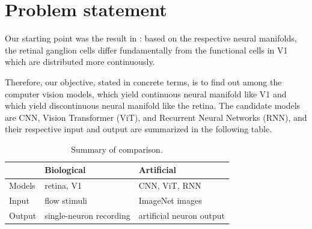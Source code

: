 \section{Problem statement}
\label{intro-objective}

Our starting point was the result in \cite{dyballa_manifold_2021}: based on the respective neural manifolds, the retinal ganglion cells differ fundamentally from the functional cells in V1 which are distributed more continuously. 


Therefore, our objective, stated in concrete terms, is to find out among the computer vision models, which yield continuous neural manifold like V1 and which yield discontinuous neural manifold like the retina. The candidate models are CNN, Vision Transformer (ViT), and Recurrent Neural Networks (RNN), and their respective input and output are summarized in the following table.

\begin{table}[H]
\centering
\begin{tabular}{|l|l|l|}
\hline
        & Biological & Artificial     \\ \hline
Models   & retina, V1      & CNN, ViT, RNN \\\hline
Input & flow stimuli \cite{visual-flow}  & ImageNet images \cite{deng2009imagenet} \\ \hline
Output & single-neuron recording & artificial neuron output \\ \hline
\end{tabular}
\caption{Summary of comparison.} 
\end{table} 



